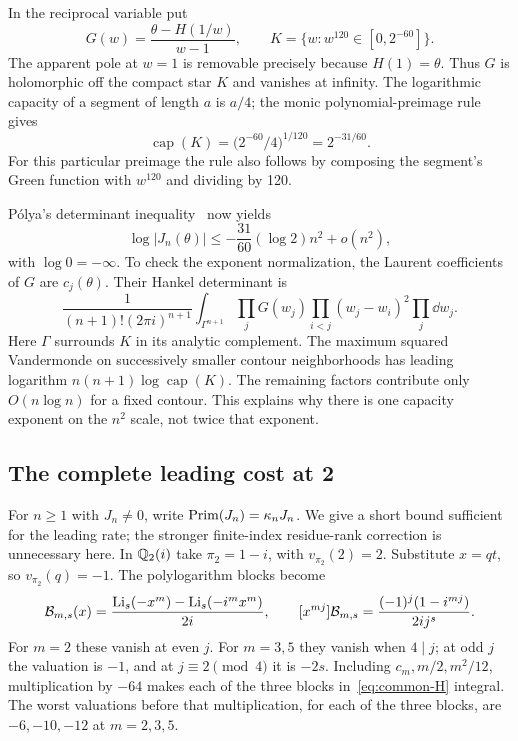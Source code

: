 In the reciprocal variable put
\[
 G(w)=\frac{\theta-H(1/w)}{w-1},\qquad
 K=\{w:w^{120}\in[0,2^{-60}]\}.
\]
The apparent pole at $w=1$ is removable precisely because $H(1)=\theta$.
Thus $G$ is holomorphic off the compact star $K$ and vanishes at infinity.
The logarithmic capacity of a segment of length $a$ is $a/4$; the
monic polynomial-preimage rule gives
\[
 \operatorname{cap}(K)=\bigl(2^{-60}/4\bigr)^{1/120}=2^{-31/60}.
\]
For this particular preimage the rule also follows by composing the
segment's Green function with $w^{120}$ and dividing by 120.

P\'olya's determinant inequality~\cite[Theorem 2.1, one variable]{Polya}
now yields
\begin{equation}\label{eq:common-real}
 \log|J_n(\theta)|\leq-\frac{31}{60}(\log2)n^2+o(n^2),
\end{equation}
with $\log0=-\infty$. To check the exponent normalization, the Laurent
coefficients of $G$ are $c_j(\theta)$. Their Hankel determinant is
\[
 \frac1{(n+1)!(2\pi i)^{n+1}}\int_{\Gamma^{n+1}}
       \prod_jG(w_j)\prod_{i<j}(w_j-w_i)^2\prod_j\dd w_j.
\]
Here $\Gamma$ surrounds $K$ in its analytic complement.
The maximum squared Vandermonde on successively smaller contour
neighborhoods has leading logarithm
$n(n+1)\log\operatorname{cap}(K)$. The remaining factors contribute
only $O(n\log n)$ for a fixed contour. This explains why there is one
capacity exponent on the $n^2$ scale, not twice that exponent.

\subsection{The complete leading cost at 2}
For $n\geq1$ with $J_n\ne0$, write $\operatorname{Prim}(J_n)=\kappa_nJ_n$.
We give a short bound sufficient for the leading rate; the stronger
finite-index residue-rank correction is unnecessary here.
In $\mathbb Q_2(i)$ take $\pi_2=1-i$, with $v_{\pi_2}(2)=2$.
Substitute $x=qt$, so $v_{\pi_2}(q)=-1$. The polylogarithm blocks become
\[
 \mathcal B_{m,s}(x)=\frac{\operatorname{Li}_s(-x^m)-\operatorname{Li}_s(-i^mx^m)}{2i},\qquad
 [x^{mj}]\mathcal B_{m,s}
       =\frac{(-1)^j(1-i^{mj})}{2ij^s}.
\]
For $m=2$ these vanish at even $j$. For $m=3,5$ they vanish when
$4\mid j$; at odd $j$ the valuation is $-1$, and at $j\equiv2\pmod4$
it is $-2s$. Including $c_m,m/2,m^2/12$, multiplication by $-64$
makes each of the three blocks in~\eqref{eq:common-H} integral.
The worst valuations before that multiplication, for each of the
three blocks, are $-6,-10,-12$ at $m=2,3,5$.

